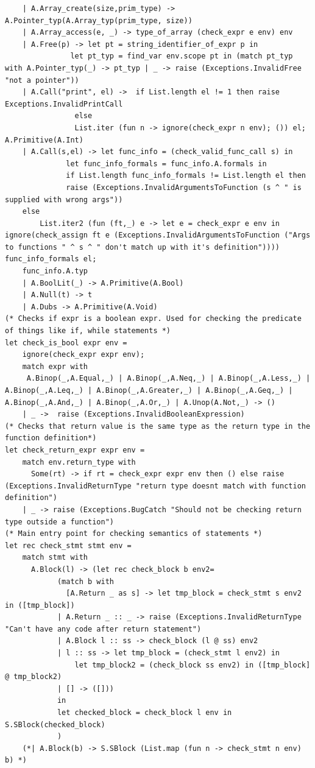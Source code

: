 \documentclass{article}
\begin{document}
\begin{lstlisting}
	| A.Array_create(size,prim_type) -> A.Pointer_typ(A.Array_typ(prim_type, size))
	| A.Array_access(e, _) -> type_of_array (check_expr e env) env
	| A.Free(p) -> let pt = string_identifier_of_expr p in 
		       let pt_typ = find_var env.scope pt in (match pt_typ with A.Pointer_typ(_) -> pt_typ | _ -> raise (Exceptions.InvalidFree "not a pointer"))
	| A.Call("print", el) ->  if List.length el != 1 then raise Exceptions.InvalidPrintCall 
				else
				List.iter (fun n -> ignore(check_expr n env); ()) el; A.Primitive(A.Int)
	| A.Call(s,el) -> let func_info = (check_valid_func_call s) in
			  let func_info_formals = func_info.A.formals in
			  if List.length func_info_formals != List.length el then
			  raise (Exceptions.InvalidArgumentsToFunction (s ^ " is supplied with wrong args"))
	else
		List.iter2 (fun (ft,_) e -> let e = check_expr e env in ignore(check_assign ft e (Exceptions.InvalidArgumentsToFunction ("Args to functions " ^ s ^ " don't match up with it's definition")))) func_info_formals el;
	func_info.A.typ
	| A.BoolLit(_) -> A.Primitive(A.Bool)
	| A.Null(t) -> t
	| A.Dubs -> A.Primitive(A.Void)
(* Checks if expr is a boolean expr. Used for checking the predicate of things like if, while statements *)
let check_is_bool expr env = 
	ignore(check_expr expr env);
	match expr with
	 A.Binop(_,A.Equal,_) | A.Binop(_,A.Neq,_) | A.Binop(_,A.Less,_) | A.Binop(_,A.Leq,_) | A.Binop(_,A.Greater,_) | A.Binop(_,A.Geq,_) | A.Binop(_,A.And,_) | A.Binop(_,A.Or,_) | A.Unop(A.Not,_) -> ()
	| _ ->  raise (Exceptions.InvalidBooleanExpression)
(* Checks that return value is the same type as the return type in the function definition*)
let check_return_expr expr env = 
	match env.return_type with
	  Some(rt) -> if rt = check_expr expr env then () else raise (Exceptions.InvalidReturnType "return type doesnt match with function definition")
	| _ -> raise (Exceptions.BugCatch "Should not be checking return type outside a function")
(* Main entry point for checking semantics of statements *)
let rec check_stmt stmt env = 
	match stmt with
	  A.Block(l) -> (let rec check_block b env2=
			(match b with
			  [A.Return _ as s] -> let tmp_block = check_stmt s env2 in ([tmp_block]) 
			| A.Return _ :: _ -> raise (Exceptions.InvalidReturnType "Can't have any code after return statement")
			| A.Block l :: ss -> check_block (l @ ss) env2
			| l :: ss -> let tmp_block = (check_stmt l env2) in 
				let tmp_block2 = (check_block ss env2) in ([tmp_block] @ tmp_block2)
			| [] -> ([]))
			in
			let checked_block = check_block l env in S.SBlock(checked_block)
			) 
	(*| A.Block(b) -> S.SBlock (List.map (fun n -> check_stmt n env) b) *)

\end{lstlisting}
\end{document}
